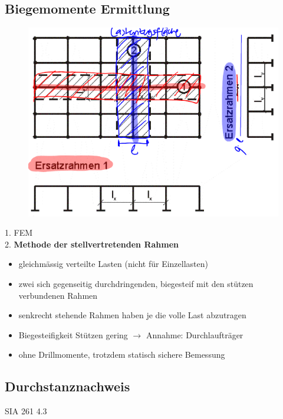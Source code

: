 	\begin{minipage}{0.5\linewidth}
		
		\subsection{Biegemomente Ermittlung}
		
		\begin{figure}
			\includegraphics[width=\linewidth, angle=270,origin=c]{images/PilzFlach3Rahmen.PNG}
		\end{figure}
	
	
	
			1. FEM \\
			2. \textbf{Methode der stellvertretenden Rahmen}

			
				\begin{itemize}
					
					\item gleichmässig verteilte Lasten (nicht für Einzellasten)
					
					\item zwei sich gegenseitig durchdringenden, biegesteif mit den stützen verbundenen Rahmen
					
					\item senkrecht stehende Rahmen haben je die volle Last abzutragen
					
					\item Biegesteifigkeit Stützen gering $\rightarrow$ Annahme: Durchlaufträger
					
					\item ohne Drillmomente, trotzdem statisch sichere Bemessung
					
				\end{itemize}
		
	\end{minipage}

	\begin{minipage}{0.5\linewidth}
		
		\subsection{Durchstanznachweis}
			SIA 261 4.3
		
	\end{minipage}